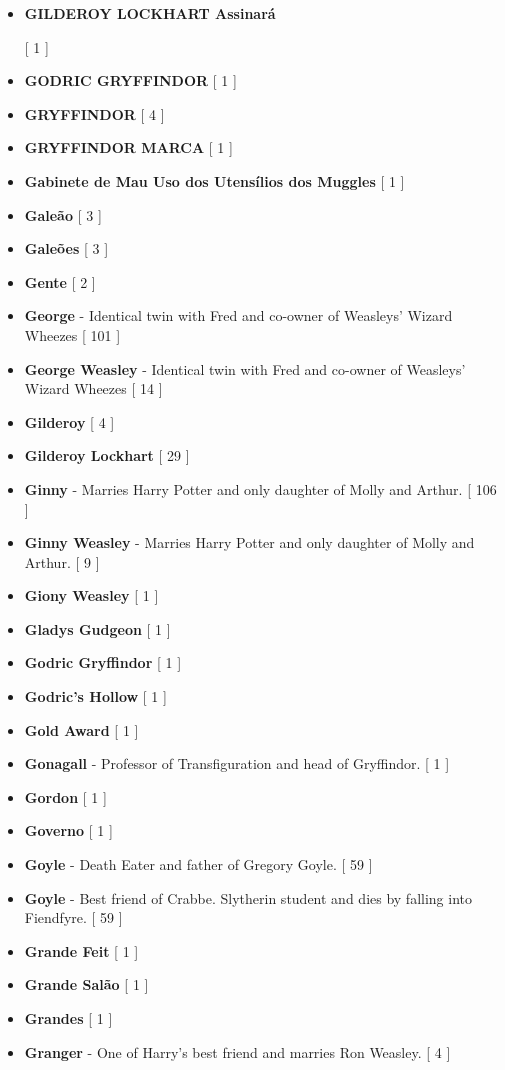 \documentclass[a4paper]{article}
\begin{document}
{\begin{itemize}
	\item \hypertarget{G}{\textbf{GILDEROY LOCKHART Assinará}} [ 1 ]
	\item \textbf{GODRIC GRYFFINDOR} [ 1 ]
	\item \textbf{GRYFFINDOR} [ 4 ]
	\item \textbf{GRYFFINDOR MARCA} [ 1 ]
	\item \textbf{Gabinete de Mau Uso dos Utensílios dos Muggles} [ 1 ]
	\item \textbf{Galeão} [ 3 ]
	\item \textbf{Galeões} [ 3 ]
	\item \textbf{Gente} [ 2 ]
	\item \textbf{George} - Identical twin with Fred and co-owner of Weasleys' Wizard Wheezes [ 101 ]
	\item \textbf{George Weasley} - Identical twin with Fred and co-owner of Weasleys' Wizard Wheezes [ 14 ]
	\item \textbf{Gilderoy} [ 4 ]
	\item \textbf{Gilderoy Lockhart} [ 29 ]
	\item \textbf{Ginny} - Marries Harry Potter and only daughter of Molly and Arthur. [ 106 ]
	\item \textbf{Ginny Weasley} - Marries Harry Potter and only daughter of Molly and Arthur. [ 9 ]
	\item \textbf{Giony Weasley} [ 1 ]
	\item \textbf{Gladys Gudgeon} [ 1 ]
	\item \textbf{Godric Gryffindor} [ 1 ]
	\item \textbf{Godric's Hollow} [ 1 ]
	\item \textbf{Gold Award} [ 1 ]
	\item \textbf{Gonagall} - Professor of Transfiguration and head of Gryffindor. [ 1 ]
	\item \textbf{Gordon} [ 1 ]
	\item \textbf{Governo} [ 1 ]
	\item \textbf{Goyle} - Death Eater and father of Gregory Goyle. [ 59 ]
	\item \textbf{Goyle} - Best friend of Crabbe. Slytherin student and dies by falling into Fiendfyre. [ 59 ]
	\item \textbf{Grande Feit} [ 1 ]
	\item \textbf{Grande Salão} [ 1 ]
	\item \textbf{Grandes} [ 1 ]
	\item \textbf{Granger} - One of Harry's best friend and marries Ron Weasley. [ 4 ]

\end{itemize}}
\end{document}
